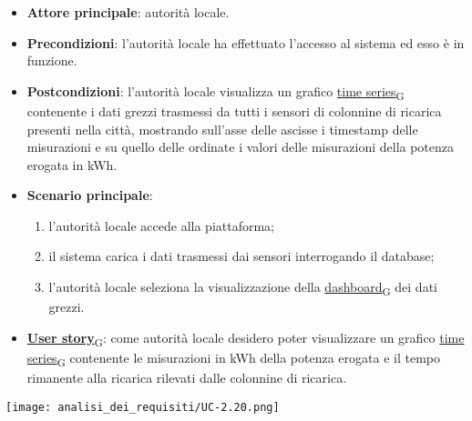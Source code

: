 \newpage
{}
\begin{itemize}
	\item \textbf{Attore principale}: autorità locale.
	\item \textbf{Precondizioni}: l'autorità locale ha effettuato l'accesso al sistema ed esso è in funzione.
	\item \textbf{Postcondizioni}: l'autorità locale visualizza un grafico \href{https://7last.github.io/docs/pb/documentazione-interna/glossario\#time-series}{time series\textsubscript{G}} contenente i dati grezzi trasmessi da tutti i sensori di colonnine di ricarica presenti nella città, mostrando sull'asse delle ascisse i timestamp delle misurazioni e su quello delle ordinate i valori delle misurazioni della potenza erogata in kWh.
	\item \textbf{Scenario principale}:
	      \begin{enumerate}
		      \item l'autorità locale accede alla piattaforma;
		      \item il sistema carica i dati trasmessi dai sensori interrogando il database;
		      \item l'autorità locale seleziona la visualizzazione della \href{https://7last.github.io/docs/pb/documentazione-interna/glossario\#dashboard}{dashboard\textsubscript{G}} dei dati grezzi.
	      \end{enumerate}
	\item \href{https://7last.github.io/docs/pb/documentazione-interna/glossario\#user-story}{\textbf{User story}\textsubscript{G}}:
	      come autorità locale desidero poter visualizzare un grafico \href{https://7last.github.io/docs/pb/documentazione-interna/glossario\#time-series}{time series\textsubscript{G}} contenente le misurazioni in kWh della potenza erogata
	      e il tempo rimanente alla ricarica rilevati dalle colonnine di ricarica.
\end{itemize}
\begin{center}
	\texttt{[image: analisi\_dei\_requisiti/UC-2.20.png]}
\end{center}



